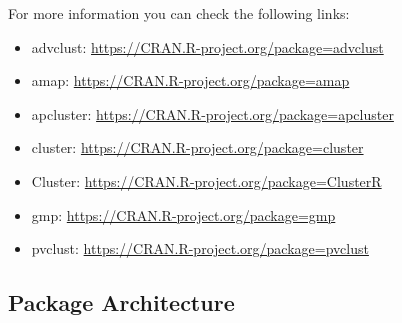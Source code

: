 For more information you can check the following links:
\begin{itemize}
  \item advclust: \url{https://CRAN.R-project.org/package=advclust}
  \item amap: \url{https://CRAN.R-project.org/package=amap}
  \item apcluster: \url{https://CRAN.R-project.org/package=apcluster}
  \item cluster: \url{https://CRAN.R-project.org/package=cluster}
  \item Cluster: \url{https://CRAN.R-project.org/package=ClusterR}
  \item gmp: \url{https://CRAN.R-project.org/package=gmp}
  \item pvclust: \url{https://CRAN.R-project.org/package=pvclust}
\end{itemize}
\subsection{Package Architecture}

